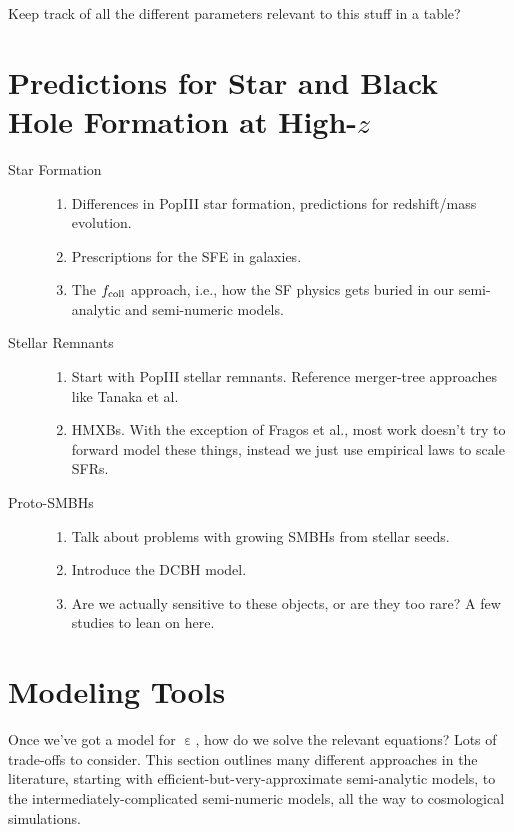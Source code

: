 \documentclass[letterpaper,titlepage,12pt]{article}
\begin{document}
Keep track of all the different parameters relevant to this stuff in a table?


\section{Predictions for Star and Black Hole Formation at High-$z$} \label{sec:source_evol} \vspace{-12pt}

\begin{description}
  \item[Star Formation] \hfill
  \begin{enumerate}
      \item Differences in PopIII star formation, predictions for redshift/mass evolution.
      \item Prescriptions for the SFE in galaxies.
      \item The $f_{\text{coll}}$ approach, i.e., how the SF physics gets buried in our semi-analytic and semi-numeric models.
  \end{enumerate}

  \item[Stellar Remnants] \hfill
  \begin{enumerate}
      \item Start with PopIII stellar remnants. Reference merger-tree approaches like Tanaka et al.
      \item HMXBs. With the exception of Fragos et al., most work doesn't try to forward model these things, instead we just use empirical laws to scale SFRs.
  \end{enumerate}
  
  \item[Proto-SMBHs]
  \begin{enumerate}
      \item Talk about problems with growing SMBHs from stellar seeds.
      \item Introduce the DCBH model.
      \item Are we actually sensitive to these objects, or are they too rare? A few studies to lean on here.
  \end{enumerate}
  
\end{description}
      

\section{Modeling Tools} \label{sec:methods} \vspace{-12pt}
Once we've got a model for $\upepsilon$, how do we solve the relevant equations? Lots of trade-offs to consider. This section outlines many different approaches in the literature, starting with efficient-but-very-approximate semi-analytic models, to the intermediately-complicated semi-numeric models, all the way to cosmological simulations. 
\end{document}
